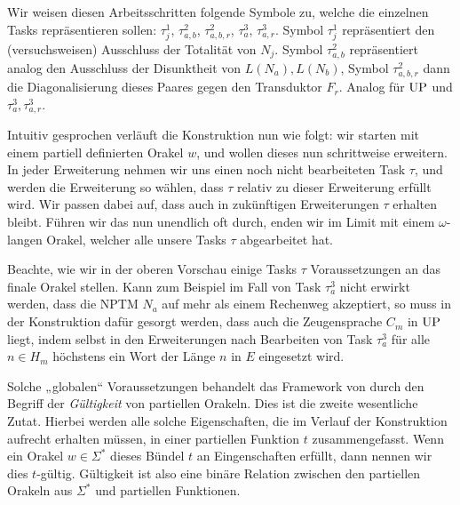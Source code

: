 Wir weisen diesen Arbeitsschritten folgende Symbole zu, welche die einzelnen Tasks repräsentieren sollen: $\tau^1_j$, $\tau^2_{a,b}$, $\tau^2_{a,b,r}$, $\tau^3_a$, $\tau^3_{a,r}$.
Symbol $\tau^1_j$ repräsentiert den (versuchsweisen) Ausschluss der Totalität von $N_j$. Symbol $\tau^2_{a,b}$ repräsentiert analog den Ausschluss der Disunktheit von $L(N_a), L(N_b)$, Symbol $\tau^2_{a,b,r}$ dann die Diagonalisierung dieses Paares gegen den Transduktor $F_r$. Analog für $\mathrm{UP}$ und $\tau^3_a, \tau^3_{a,r}$.

Intuitiv gesprochen verläuft die Konstruktion nun wie folgt: wir starten mit einem partiell definierten Orakel $w$, und wollen dieses nun schrittweise erweitern. In jeder Erweiterung nehmen wir uns einen noch nicht bearbeiteten Task $\tau$, und werden die Erweiterung so wählen, dass $\tau$ relativ zu dieser Erweiterung erfüllt wird. Wir passen dabei auf, dass auch in zukünftigen Erweiterungen $\tau$ erhalten bleibt.
Führen wir das nun unendlich oft durch, enden wir im Limit mit einem $\omega$-langen Orakel, welcher alle unsere Tasks $\tau$ abgearbeitet hat.

Beachte, wie wir in der oberen Vorschau einige Tasks $\tau$ Voraussetzungen an das finale Orakel stellen. Kann zum Beispiel im Fall von Task $\tau^3_a$ nicht erwirkt werden, dass die NPTM $N_a$ auf mehr als einem Rechenweg akzeptiert, so muss in der Konstruktion dafür gesorgt werden, dass auch die Zeugensprache $C_m$ in $\mathrm{UP}$ liegt, indem selbst in den Erweiterungen nach Bearbeiten von Task $\tau^3_a$ für alle $n\in H_m$ höchstens ein Wort der Länge $n$ in $E$ eingesetzt wird.

Solche „globalen“ Voraussetzungen behandelt das Framework von \citeauthor{dose_np-completeness_2019} durch den Begriff der \emph{Gültigkeit} von partiellen Orakeln. Dies ist die zweite wesentliche Zutat.
Hierbei werden alle solche Eigenschaften, die im Verlauf der Konstruktion aufrecht erhalten müssen, in einer partiellen Funktion $t$ zusammengefasst.
Wenn ein Orakel $w\in\Sigma^*$ dieses Bündel $t$ an Eingenschaften erfüllt, dann nennen wir dies $t$-gültig.
Gültigkeit ist also eine binäre Relation zwischen den partiellen Orakeln aus $\Sigma^*$ und partiellen Funktionen.

